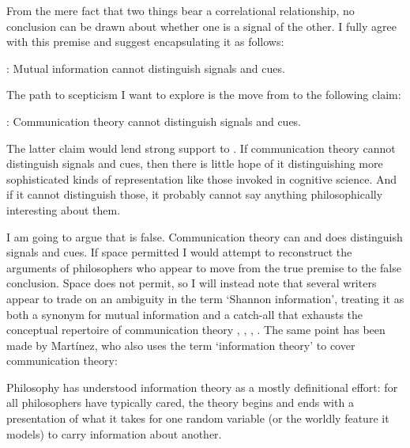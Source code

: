 \documentclass[12pt]{article}
\begin{document}
From the mere fact that two things bear a correlational relationship, no conclusion can be drawn about whether one is a signal of the other.
I fully agree with this premise and suggest encapsulating it as follows:

\begin{myquote}
\ami: Mutual information cannot distinguish signals and cues.
\end{myquote}

\noindent The path to scepticism I want to explore is the move from \ami{} to the following claim:

\begin{myquote}
\act: Communication theory cannot distinguish signals and cues.
\end{myquote}

\noindent The latter claim would lend strong support to \tic{}.
If communication theory cannot distinguish signals and cues, then there is little hope of it distinguishing more sophisticated kinds of representation like those invoked in cognitive science.
And if it cannot distinguish those, it probably cannot say anything philosophically interesting about them.

I am going to argue that \act{} is false.
Communication theory can and does distinguish signals and cues.
If space permitted I would attempt to reconstruct the arguments of philosophers who appear to move from the true premise to the false conclusion.
Space does not permit, so I will instead note that several writers appear to trade on an ambiguity in the term `Shannon information', treating it as both a synonym for mutual information and a catch-all that exhausts the conceptual repertoire of communication theory \citep[p. 1 and $\S$2]{godfrey-smith2016biological}, \citep[759]{owren2010redefining}, \citep[106]{dennett2017bacteria}, \citep[p. 12, n. 11 and p. 78, n. 5]{shea2018representation}.
The same point has been made by Mart\'{i}nez, who also uses the term `information theory' to cover communication theory:

\begin{myquote}
Philosophy has understood information theory as a mostly definitional effort: for all philosophers have typically cared, the theory begins and ends with a presentation of what it takes for one random variable (or the worldly feature it models) to carry information about another.
\par\hspace*{\fill}\citet[1216]{martinez2019representations}
\end{myquote}
\end{document}
